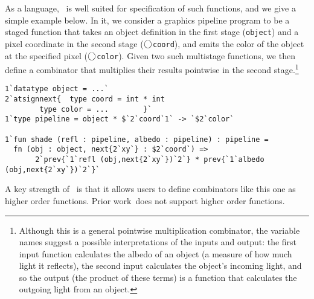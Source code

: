 As a language, \lang\ is well suited for specification of such functions,
and we give a simple example below.
In it, we consider a graphics pipeline program to be a
staged function that takes an object definition in the first stage (\texttt{object})
and a pixel coordinate in the second stage ($\bigcirc$\texttt{coord}), 
and emits the color of the object at the specified pixel ($\bigcirc$\texttt{color}). 
Given two such multistage functions, we then define a combinator
that multiplies their results pointwise in the second 
stage.\footnote{Although this is a general pointwise multiplication combinator, 
the variable names suggest a possible interpretations of the inputs and output:
the first input function calculates the albedo of an object (a measure of how much light it reflects),
the second input calculates the object's incoming light,
and so the output (the product of these terms) is a function that calculates 
the outgoing light from an object.}
%
\begin{lstlisting} 
1`datatype object = ...`
2`atsignnext{  type coord = int * int
        type color = ...        }`
1`type pipeline = object * $`2`coord`1` -> `$2`color`

1`fun shade (refl : pipeline, albedo : pipeline) : pipeline =
  fn (obj : object, next{2`xy`} : $2`coord`) =>
       2`prev{`1`refl (obj,next{2`xy`})`2`} * prev{`1`albedo (obj,next{2`xy`})`2`}`
\end{lstlisting}
%
A key strength of \lang\ is that it allows users to define combinators like this one as higher order functions.
Prior work\,\cite{Foley:2011} does not support higher order functions.